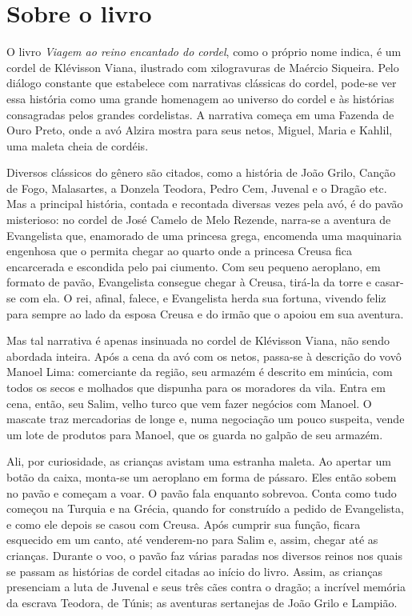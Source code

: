 \documentclass[11pt]{extarticle}
\begin{document}

\section{Sobre o livro}
O livro \textit{Viagem ao reino encantado do cordel}, como o próprio nome indica, é um cordel de Klévisson Viana, ilustrado com xilogravuras de Maércio Siqueira. Pelo diálogo constante que estabelece com narrativas clássicas do cordel, pode-se ver essa história como uma grande homenagem ao universo do cordel e às histórias consagradas pelos grandes cordelistas. A narrativa começa em uma Fazenda de Ouro Preto, onde a avó Alzira mostra para seus netos, Miguel, Maria e Kahlil, uma maleta cheia de cordéis.

Diversos clássicos do gênero são citados, como a história de João Grilo, Canção de Fogo, Malasartes, a Donzela Teodora, Pedro Cem, Juvenal e o Dragão etc. Mas a principal história, contada e recontada diversas vezes pela avó, é do pavão misterioso: no cordel de José Camelo de Melo Rezende, narra-se a aventura de Evangelista que, enamorado de uma princesa grega, encomenda uma maquinaria engenhosa que o permita chegar ao quarto onde a princesa Creusa fica encarcerada e escondida pelo pai ciumento. Com seu pequeno aeroplano, em formato de pavão, Evangelista consegue chegar à Creusa, tirá-la da torre e casar-se com ela. O rei, afinal, falece, e Evangelista herda sua fortuna, vivendo feliz para sempre ao lado da esposa Creusa e do irmão que o apoiou em sua aventura.

Mas tal narrativa é apenas insinuada no cordel de Klévisson Viana, não sendo abordada inteira. Após a cena da avó com os netos, passa-se à descrição do vovô Manoel Lima: comerciante da região, seu armazém é descrito em minúcia, com todos os secos e molhados que dispunha para os moradores da vila. Entra em cena, então, seu Salim, velho turco que vem fazer negócios com Manoel. O mascate traz mercadorias de longe e, numa negociação um pouco suspeita, vende um lote de produtos para Manoel, que os guarda no galpão de seu armazém.

Ali, por curiosidade, as crianças avistam uma estranha maleta. Ao apertar um botão da caixa, monta-se um aeroplano em forma de pássaro. Eles então sobem no pavão e começam a voar. O pavão fala enquanto sobrevoa. Conta como tudo começou na Turquia e na Grécia, quando for construído a pedido de Evangelista, e como ele depois se casou com Creusa. Após cumprir sua função, ficara esquecido em um canto, até venderem-no para Salim e, assim, chegar até as crianças. Durante o voo, o pavão faz várias paradas nos diversos reinos nos quais se passam as histórias de cordel citadas ao início do livro. Assim, as crianças presenciam a luta de Juvenal e seus três cães contra o dragão; a incrível memória da escrava Teodora, de Túnis; as aventuras sertanejas de João Grilo e Lampião.
\end{document}
